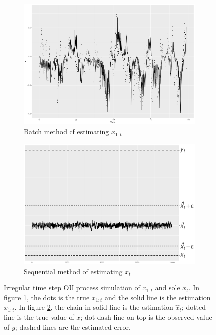 \begin{figure}[h]
\centering
\begin{subfigure}[h]{0.45\textwidth}
\includegraphics[width=\textwidth]{Chapters/05MCMCOU/plots/simudataOUallX.pdf}
\caption{Batch method of estimating $x_{1:t}$}\label{MCMCOUallX}
\end{subfigure}
\begin{subfigure}[h]{0.45\textwidth}
\includegraphics[width=\textwidth]{Chapters/05MCMCOU/plots/simudataOUXt2.pdf}
\caption{Sequential method of estimating $x_t$}\label{MCMCOUallXt2}
\end{subfigure}
\caption{Irregular time step OU process simulation of $x_{1:t}$ and sole $x_t$. In figure \ref{MCMCOUallX}, the dots is the true $x_{1:t}$ and the solid line is the estimation $\hat{x}_{1:t}$. In figure \ref{MCMCOUallXt2}, the chain in solid line is the estimation $\hat{x}_t$; dotted line is the true value of $x$; dot-dash line on top is the observed value of $y$; dashed lines are the estimated error. }
\label{simuOUxt}
\end{figure}





